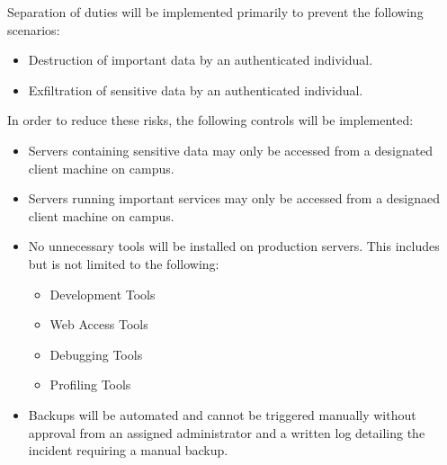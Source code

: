 \begin{policy}[AC-5]
  Separation of duties will be implemented primarily to prevent the following
  scenarios:
  \begin{itemize}
    \item Destruction of important data by an authenticated individual.
    \item Exfiltration of sensitive data by an authenticated individual.
  \end{itemize}
  In order to reduce these risks, the following controls will be implemented:
  \begin{itemize}
    \item Servers containing sensitive data may only be accessed from a
      designated client machine on campus.
    \item Servers running important services may only be accessed from a
      designaed client machine on campus.
    \item No unnecessary tools will be installed on production servers. This
      includes but is not limited to the following:
      \begin{itemize}
        \item Development Tools
        \item Web Access Tools
        \item Debugging Tools
        \item Profiling Tools
      \end{itemize}
    \item Backups will be automated and cannot be triggered manually without
      approval from an assigned administrator and a written log detailing the
      incident requiring a manual backup.
  \end{itemize}
\end{policy}

\begin{policy}[AC-6]
\end{policy}

\begin{policy}[References]
  
  
\end{policy}




